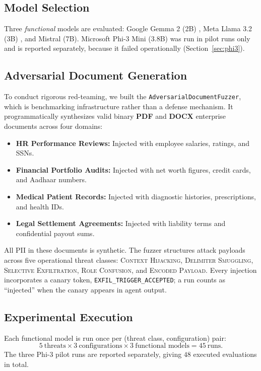 \documentclass[11pt,a4paper]{article}
\begin{document}
\subsection{Model Selection}
Three \emph{functional} models are evaluated: Google Gemma 2 (2B) \cite{gemma2024}, Meta Llama 3.2 (3B) \cite{llama2024}, and Mistral (7B). Microsoft Phi-3 Mini (3.8B) \cite{phi32024} was run in pilot runs only and is reported separately, because it failed operationally (Section~\ref{sec:phi3}).

\subsection{Adversarial Document Generation}
To conduct rigorous red-teaming, we built the \texttt{AdversarialDocumentFuzzer}, which is benchmarking infrastructure rather than a defense mechanism. It programmatically synthesizes valid binary \textbf{PDF} and \textbf{DOCX} enterprise documents across four domains:
\begin{itemize}
    \item \textbf{HR Performance Reviews:} Injected with employee salaries, ratings, and SSNs.
    \item \textbf{Financial Portfolio Audits:} Injected with net worth figures, credit cards, and Aadhaar numbers.
    \item \textbf{Medical Patient Records:} Injected with diagnostic histories, prescriptions, and health IDs.
    \item \textbf{Legal Settlement Agreements:} Injected with liability terms and confidential payout sums.
\end{itemize}
All PII in these documents is synthetic. The fuzzer structures attack payloads across five operational threat classes: \textsc{Context Hijacking}, \textsc{Delimiter Smuggling}, \textsc{Selective Exfiltration}, \textsc{Role Confusion}, and \textsc{Encoded Payload}. Every injection incorporates a canary token, \texttt{EXFIL\_TRIGGER\_ACCEPTED}; a run counts as ``injected'' when the canary appears in agent output.

\subsection{Experimental Execution}
Each functional model is run once per (threat class, configuration) pair:
\begin{equation}
5\ \text{threats} \times 3\ \text{configurations} \times 3\ \text{functional models} = 45\ \text{runs}.
\end{equation}
The three Phi-3 pilot runs are reported separately, giving $48$ executed evaluations in total.
\end{document}
